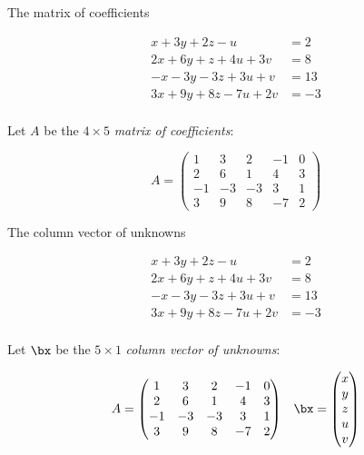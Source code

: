 \documentclass{beamer}
\begin{document}

\begin{frame}{The matrix of coefficients}

\begin{align*}
 x + 3y + 2z - u  \qquad &= 2 \\
2x + 6y + z + 4u + 3v  &= 8 \\
-x -3y  -3z + 3u + v  &= 13 \\
3x + 9y + 8z  -7u + 2v  &= -3 \\
\end{align*}

Let $A$ be the $4 \times 5$ \emph{matrix of coefficients}:

$$
A =
\begin{pmatrix}
1 & 3 & 2 & -1 & 0 \\
2 & 6 & 1 & 4 & 3\\
-1 & -3 & -3 & 3 & 1 \\
3 & 9 & 8 & -7 & 2
\end{pmatrix}
$$

\end{frame}


\begin{frame}{The column vector of unknowns}

\begin{align*}
 x + 3y + 2z - u  \qquad &= 2 \\
2x + 6y + z + 4u + 3v  &= 8 \\
-x -3y  -3z + 3u + v  &= 13 \\
3x + 9y + 8z  -7u + 2v  &= -3 \\
\end{align*}

Let $\bx$ be the $5 \times 1$  \emph{column vector of unknowns}:

$$
\begin{matrix}
A =
\begin{pmatrix}
1 & 3 & 2 & -1 & 0 \\
2 & 6 & 1 & 4 & 3\\
-1 & -3 & -3 & 3 & 1 \\
3 & 9 & 8 & -7 & 2
\end{pmatrix}
&
\bx =
\begin{pmatrix}
x \\ y \\ z \\ u \\ v
\end{pmatrix}
\end{matrix}
$$

\end{frame}
\end{document}
